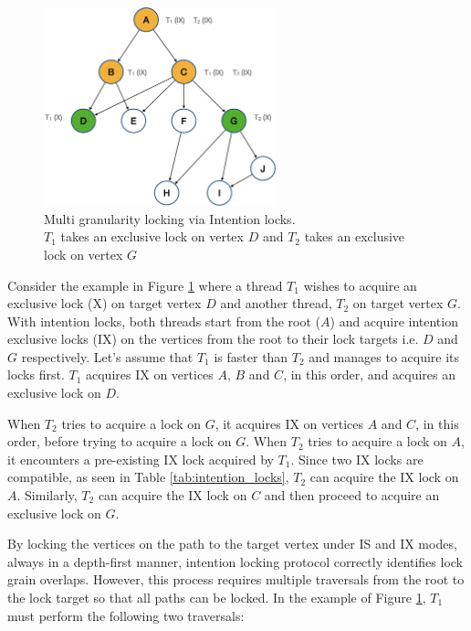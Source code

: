 \begin{figure}[h]
    \centering
    \captionsetup{justification=centering}
    \includegraphics[width=0.6\textwidth]{figures/IntentionLockExample.png}
    \caption{Multi granularity locking via Intention locks. \\ $T_1$ takes an exclusive lock on vertex $D$ and $T_2$ takes an exclusive lock on vertex $G$ }
    \label{fig:intention_lock_example}
\end{figure}

Consider the example in Figure \ref{fig:intention_lock_example} where a thread $T_1$ wishes to acquire an exclusive lock (X) on target vertex $D$ and another thread, $T_2$ on target vertex $G$. 
With intention locks, both threads start from the root ($A$) and acquire intention exclusive locks (IX) on the vertices from the root to their lock targets i.e. $D$ and $G$ respectively. 
Let's assume that $T_1$ is faster than $T_2$ and manages to acquire its locks first. 
$T_1$ acquires IX on vertices $A$, $B$ and $C$, in this order, and acquires an exclusive lock on $D$. 

When $T_2$ tries to acquire a lock on $G$, it acquires IX on vertices $A$ and $C$, in this order, before trying to acquire a lock on $G$. 
When $T_2$ tries to acquire a lock on $A$, it encounters a pre-existing  IX lock acquired by $T_1$. 
Since two IX locks are compatible, as seen in Table \ref{tab:intention_locks}, $T_2$ can acquire the IX lock on $A$.
Similarly, $T_2$ can acquire the IX lock on $C$ and then proceed to acquire an exclusive lock on $G$.


By locking the vertices on the path to the target vertex under IS and IX modes, always in a depth-first manner, 
intention locking protocol correctly identifies lock grain overlaps. 
However, this process requires multiple traversals from the root to the lock target so that all paths can be locked. 
In the example of Figure \ref{fig:intention_lock_example}, $T_1$ must perform the following two traversals:

